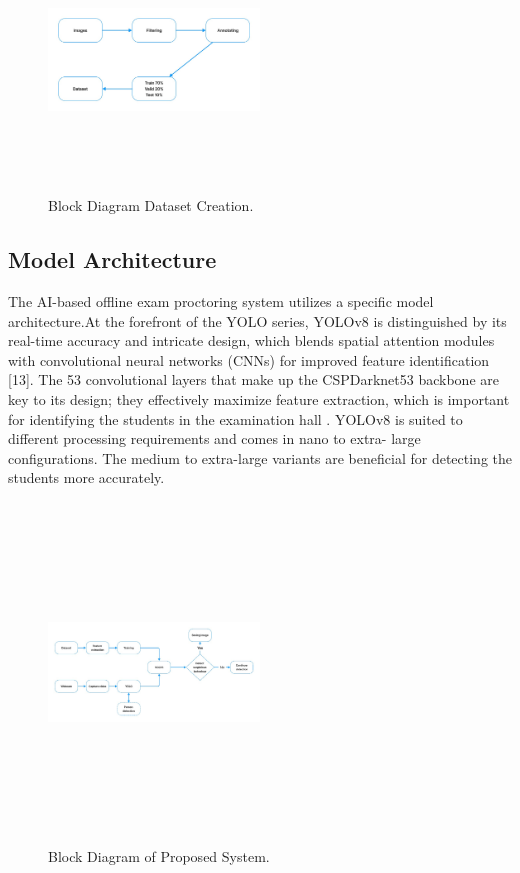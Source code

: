 \documentclass[conference]{IEEEtran}
\begin{document}
\begin{figure}[htbp]
\centering
\includegraphics[width=0.5\textwidth, height=7cm]{images/block.jpeg}  %
\caption{Block Diagram Dataset Creation.}
\label{fig}
\end{figure}


\subsection{Model Architecture}
The AI-based offline exam proctoring system utilizes a specific model architecture.At the forefront of the YOLO series, YOLOv8 is distinguished by its real-time accuracy and intricate design, which blends spatial attention modules with convolutional neural networks (CNNs) for improved feature identification [13]. The 53 convolutional layers that make up the CSPDarknet53 backbone are key to its design; they effectively maximize feature extraction, which is important for identifying the students in the examination hall . YOLOv8 is suited to different processing requirements and comes in nano to extra- large configurations. The medium to extra-large variants are beneficial for detecting the students more accurately.

\begin{figure}[htbp]
\centering
\includegraphics[width=0.5\textwidth, height=9cm]{images/ARC.jpeg}
\caption{Block Diagram of Proposed System.}
\label{fig}
\end{figure}
\end{document}

